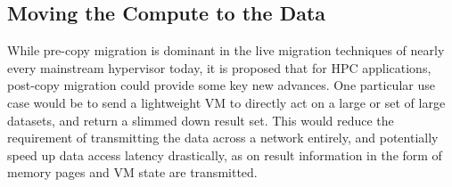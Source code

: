 

%
%







\subsection{Moving the Compute to the Data}


While pre-copy migration is dominant in the live migration techniques of nearly every mainstream hypervisor today, it is proposed that for HPC applications, post-copy migration could provide some key new advances. One particular use case would be to send a lightweight VM to directly act on a large or set of large datasets, and return a slimmed down result set. This would reduce the requirement of transmitting the data across a network entirely, and potentially speed up data access latency drastically, as on result information in the form of memory pages and VM state are transmitted. 

